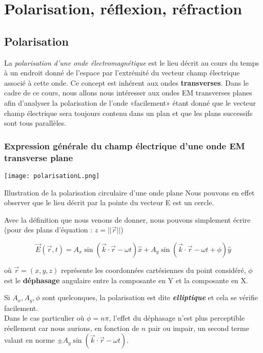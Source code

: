 ﻿\chapter{Polarisation, réflexion, réfraction}

\section{Polarisation} 

La \textit{polarisation d'une onde électromagnétique} est le lieu décrit au cours du temps à un endroit donné de l'espace par l'extrémité du vecteur champ
électrique associé à cette onde. Ce concept est inhérent aux ondes \textbf{transverses}. 
Dans le cadre de ce cours, nous allons nous intéresser aux ondes EM transverses planes afin d'analyser la polarisation de l'onde «facilement» étant donné que le vecteur champ électrique sera toujours
contenu dans un plan et que les plans successifs sont tous parallèles. 

\subsection{Expression générale du champ électrique d'une onde EM transverse plane}
\begin{marginfigure}
	\texttt{[image: polarisationL.png]}
	\caption{Illustration de la polarisation circulaire d'une onde plane Nous pouvons en effet observer que le lieu décrit par la pointe du vecteur E est un cercle.}
\end{marginfigure}
Avec la définition que nous venons de donner, nous pouvons simplement écrire (pour des plans d'équation : $ z = ||\vec{r}||$) 

\[\vec{E}(\vec{r},t) = A_{x} \sin(\vec{k}\cdot \vec{r} - \omega t) \hat{x} + A_{y} \sin(\vec{k}\cdot \vec{r} - \omega t + \phi) \hat{y}\] 

où $\vec{r} = (x,y,z)$ représente les coordonnées cartésiennes du point considéré, $\phi$ est le \textbf{déphasage} angulaire entre 
la composante en Y
et la composante en X.

Si $A_{x},A_{y}, \phi$ 
sont quelconques, la polarisation est dite
 \textit{\textbf{elliptique}}
et cela se vérifie facilement.\\
Dans le cas particulier où $\phi = n \pi$, l'effet du déphasage n'est plus perceptible réellement car nous aurions, en fonction 
de $n$ pair ou impair, un second terme valant en norme $\pm A_{y} \sin(\vec{k}\cdot \vec{r} - \omega t)$.

